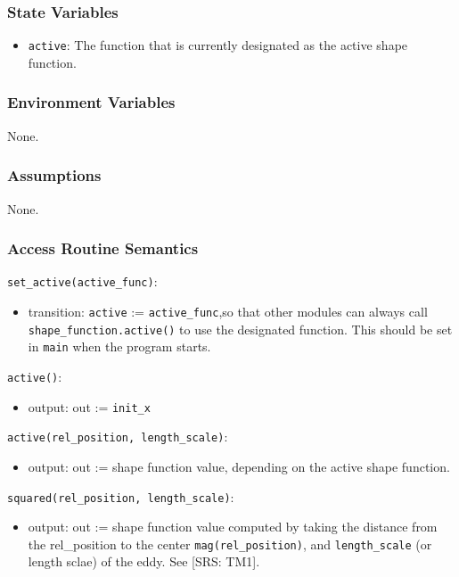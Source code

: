 \documentclass[12pt, titlepage]{article}
\begin{document}
\subsubsection{State Variables}
\begin{itemize}
  \item \texttt{active}: The function that is currently designated as the active shape function.
\end{itemize}

\subsubsection{Environment Variables}
None.

\subsubsection{Assumptions}
None.

\subsubsection{Access Routine Semantics}

\noindent \texttt{set\_active(active\_func)}:
\begin{itemize}
\item transition: \texttt{active} := \texttt{active\_func},\newline so that other modules can always call \texttt{shape\_function.active()} to use the designated function. This should be set in \texttt{main} when the program starts.
\end{itemize}

\noindent \texttt{active()}:
\begin{itemize}
  \item output: out := \texttt{init\_x}
\end{itemize}

\noindent \texttt{active(rel\_position, length\_scale)}:
\begin{itemize}
  \item output: out := shape function value, depending on the active shape function.
\end{itemize}

\noindent \texttt{squared(rel\_position, length\_scale)}:
\begin{itemize}
  \item output: out := shape function value computed by taking the distance from the rel\_position to the center \texttt{mag(rel\_position)}, and \texttt{length\_scale} (or length sclae) of the eddy. See [SRS: TM1].
\end{itemize}
\end{document}
